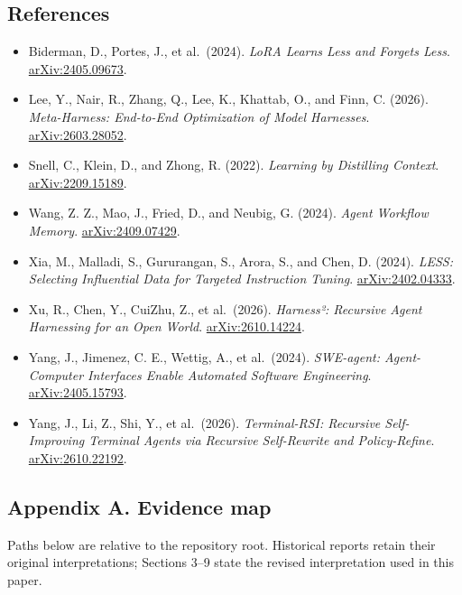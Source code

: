 \documentclass[
  10pt,
]{article}
\providecommand{\tightlist}{%
  \setlength{\itemsep}{0pt}\setlength{\parskip}{0pt}}
\begin{document}
\subsection{References}\label{references}

\begin{itemize}
\tightlist
\item
  Biderman, D., Portes, J., et al.~(2024). \emph{LoRA Learns Less and
  Forgets Less}.
  \href{https://arxiv.org/abs/2405.09673}{arXiv:2405.09673}.
\item
  Lee, Y., Nair, R., Zhang, Q., Lee, K., Khattab, O., and Finn, C.
  (2026). \emph{Meta-Harness: End-to-End Optimization of Model
  Harnesses}. \href{https://arxiv.org/abs/2603.28052}{arXiv:2603.28052}.
\item
  Snell, C., Klein, D., and Zhong, R. (2022). \emph{Learning by
  Distilling Context}.
  \href{https://arxiv.org/abs/2209.15189}{arXiv:2209.15189}.
\item
  Wang, Z. Z., Mao, J., Fried, D., and Neubig, G. (2024). \emph{Agent
  Workflow Memory}.
  \href{https://arxiv.org/abs/2409.07429}{arXiv:2409.07429}.
\item
  Xia, M., Malladi, S., Gururangan, S., Arora, S., and Chen, D. (2024).
  \emph{LESS: Selecting Influential Data for Targeted Instruction
  Tuning}. \href{https://arxiv.org/abs/2402.04333}{arXiv:2402.04333}.
\item
  Xu, R., Chen, Y., CuiZhu, Z., et al.~(2026). \emph{Harness²: Recursive
  Agent Harnessing for an Open World}.
  \href{https://arxiv.org/abs/2610.14224}{arXiv:2610.14224}.
\item
  Yang, J., Jimenez, C. E., Wettig, A., et al.~(2024). \emph{SWE-agent:
  Agent-Computer Interfaces Enable Automated Software Engineering}.
  \href{https://arxiv.org/abs/2405.15793}{arXiv:2405.15793}.
\item
  Yang, J., Li, Z., Shi, Y., et al.~(2026). \emph{Terminal-RSI:
  Recursive Self-Improving Terminal Agents via Recursive Self-Rewrite
  and Policy-Refine}.
  \href{https://arxiv.org/abs/2610.22192}{arXiv:2610.22192}.
\end{itemize}

\subsection{Appendix A. Evidence map}\label{appendix-a.-evidence-map}

Paths below are relative to the repository root. Historical reports
retain their original interpretations; Sections 3--9 state the revised
interpretation used in this paper.
\end{document}
